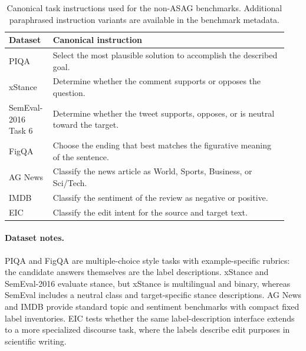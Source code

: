 \begin{table}[t]
\centering
\small
\begin{tabular}{p{0.14\linewidth}p{0.80\linewidth}}
\toprule
\textbf{Dataset} & \textbf{Canonical instruction} \\
\midrule
PIQA & Select the most plausible solution to accomplish the described goal. \\
xStance & Determine whether the comment supports or opposes the question. \\
SemEval-2016 Task 6 & Determine whether the tweet supports, opposes, or is neutral toward the target. \\
FigQA & Choose the ending that best matches the figurative meaning of the sentence. \\
AG News & Classify the news article as World, Sports, Business, or Sci/Tech. \\
IMDB & Classify the sentiment of the review as negative or positive. \\
EIC & Classify the edit intent for the source and target text. \\
\bottomrule
\end{tabular}
\caption{Canonical task instructions used for the non-ASAG benchmarks. Additional paraphrased instruction variants are available in the benchmark metadata.}
\label{tab:non_asag_instructions}
\end{table}

\paragraph{Dataset notes.}
PIQA and FigQA are multiple-choice style tasks with example-specific rubrics:
the candidate answers themselves are the label descriptions. xStance and
SemEval-2016 evaluate stance, but xStance is multilingual and binary, whereas
SemEval includes a neutral class and target-specific stance descriptions. AG
News and IMDB provide standard topic and sentiment benchmarks with compact fixed
label inventories. EIC tests whether the same label-description interface
extends to a more specialized discourse task, where the labels describe edit
purposes in scientific writing.
